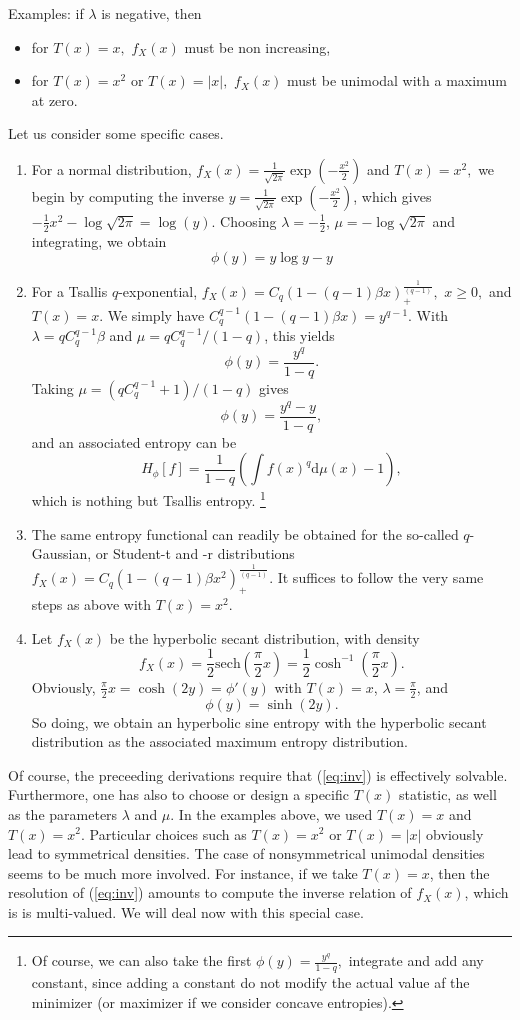 \documentclass[english,onecolumn]{elsarticle}
\begin{document}
Examples: if $\lambda$ is negative, then 
\begin{itemize}
\item for $T(x)=x,$ $f_{X}(x)$ must be non increasing,
\item for $T(x)=x^{2}$ or $T(x)=|x|,$ $f_{X}(x)$ must be unimodal with
a maximum at zero. 
\end{itemize}
Let us consider some specific cases. 
\begin{enumerate}
\item For a normal distribution, $f_{X}(x)=\frac{1}{\sqrt{2\pi}}\exp(-\frac{x^{2}}{2})$
and $T(x)=x^{2},$ we begin by computing the inverse $y=\frac{1}{\sqrt{2\pi}}\exp(-\frac{x^{2}}{2})$,
which gives $-\frac{1}{2}x^{2}-\log\sqrt{2\pi}=\log(y).$ Choosing
$\lambda=-\frac{1}{2}$, $\mu=-\log\sqrt{2\pi}$ and integrating,
we obtain 
\[
\phi(y)=y\log y-y
\]

\item For a Tsallis $q$-exponential, $f_{X}(x)=C_{q}\left(1-(q-1)\beta x\right)_{+}^{\frac{1}{(q-1)}},$
$x\geq0,$ and $T(x)=x$. We simply have $C_{q}^{q-1}\left(1-(q-1)\beta x\right)=y^{q-1}$.
With $\lambda=qC_{q}^{q-1}\beta$ and $\mu=qC_{q}^{q-1}/(1-q)$, this
yields 
\[
\phi(y)=\frac{y^{q}}{1-q}.
\]
Taking $\mu=\left(qC_{q}^{q-1}+1\right)/(1-q)$ gives 
\[
\phi(y)=\frac{y^{q}-y}{1-q},
\]
and an associated entropy can be 
\[
H_{\phi}[f]=\frac{1}{1-q}\left(\int f(x)^{q}\text{d}\mu(x)-1\right),
\]
which is nothing but Tsallis entropy.%
\footnote{Of course, we can also take the first $\phi(y)=\frac{y^{q}}{1-q},$
integrate and add any constant, since adding a constant do not modify
the actual value af the minimizer (or maximizer if we consider concave
entropies). %
}
\item The same entropy functional can readily be obtained for the so-called
$q$-Gaussian, or Student-t and -r distributions $f_{X}(x)=C_{q}\left(1-(q-1)\beta x^{2}\right)_{+}^{\frac{1}{(q-1)}}.$
It suffices to follow the very same steps as above with $T(x)=x^{2}.$ 
\item Let $f_{X}(x)$ be the hyperbolic secant distribution, with density
\[
f_{X}(x)=\frac{1}{2}\text{sech}(\frac{\pi}{2}x)=\frac{1}{2}\cosh^{-1}(\frac{\pi}{2}x).
\]
Obviously, $\frac{\pi}{2}x=\cosh(2y)=\phi'(y)$ with $T(x)=x$, $\lambda=\frac{\pi}{2}$,
and 
\[
\phi(y)=\sinh(2y).
\]
So doing, we obtain an hyperbolic sine entropy with the hyperbolic
secant distribution as the associated maximum entropy distribution.
\end{enumerate}
Of course, the preceeding derivations require that (\ref{eq:inv})
is effectively solvable. Furthermore, one has also to choose or design
a specific $T(x)$ statistic, as well as the parameters $\lambda$
and $\mu$. In the examples above, we used $T(x)=x$ and $T(x)=x^{2}.$
Particular choices such as $T(x)=x^{2}$ or $T(x)=|x|$ obviously
lead to symmetrical densities. The case of nonsymmetrical unimodal
densities seems to be much more involved. For instance, if we take
$T(x)=x$, then the resolution of (\ref{eq:inv}) amounts to compute
the inverse relation of $f_{X}(x)$, which is is multi-valued. We
will deal now with this special case. 
\end{document}

